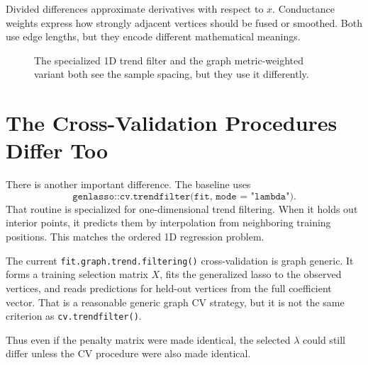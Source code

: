 \documentclass[11pt]{article}
\begin{document}
Divided differences approximate derivatives with respect to \(x\).  Conductance
weights express how strongly adjacent vertices should be fused or smoothed.
Both use edge lengths, but they encode different mathematical meanings.

\begin{figure}[ht]
\centering
{}
\caption{The specialized 1D trend filter and the graph metric-weighted variant
both see the sample spacing, but they use it differently.}
\end{figure}

\section{The Cross-Validation Procedures Differ Too}

There is another important difference.  The baseline uses
\[
  \texttt{genlasso::cv.trendfilter(fit,\ mode = "lambda")}.
\]
That routine is specialized for one-dimensional trend filtering.  When it holds
out interior points, it predicts them by interpolation from neighboring
training positions.  This matches the ordered 1D regression problem.

The current \texttt{fit.graph.trend.filtering()} cross-validation is graph
generic.  It forms a training selection matrix \(X\), fits the generalized
lasso to the observed vertices, and reads predictions for held-out vertices
from the full coefficient vector.  That is a reasonable generic graph CV
strategy, but it is not the same criterion as \texttt{cv.trendfilter()}.

Thus even if the penalty matrix were made identical, the selected \(\lambda\)
could still differ unless the CV procedure were also made identical.
\end{document}
